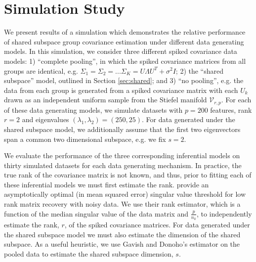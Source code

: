 \documentclass{article}
\begin{document}




\section{Simulation Study}

We present results of a simulation which demonstrates the
relative performance of shared subspace group covariance estimation
under different data generating models.  In this simulation, we consider three different
spiked covariance data models: 1) ``complete pooling'', in which the
spiked covariance matrices from all groups are identical, e.g.
$\Sigma_1 = \Sigma_2 = ... \Sigma_K = U\Lambda U^T + \sigma^2I$; 2)
the ``shared subspace'' model, outlined in Section \ref{sec:shared};
and 3) ``no pooling'', e.g. the data from each group is generated from
a spiked covariance matrix with each $U_k$ drawn as an independent
uniform sample from the Stiefel manifold $\mathcal{V}_{r, p}$.  For
each of these data generating models, we simulate datasets
with $p=200$ features, rank $r=2$ and eigenvalues
$(\lambda_1, \lambda_2) = (250, 25)$.  For data generated under the
shared subspace model, we additionally assume that the first two
eigenvectors span a common two dimensional subspace, e.g. we fix
$s=2$. 

We evaluate the performance of the three corresponding inferential
models on thirty simulated datasets for each data generating
mechanism.  In practice, the true rank of the covariance matrix is not
known, and thus, prior to fitting each of these inferential models we
must first estimate the rank.  \citet{Gavish2014} provide an
asymptotically optimal (in mean squared error) singular value
threshold for low rank matrix recovery with noisy data.  We use their
rank estimator, which is a function of the median singular value of
the data matrix and $\frac{p}{n_k}$, to independently estimate the
rank, $r$, of the spiked covariance matrices.  For data generated
under the shared subspace model we must also estimate the dimension of
the shared subspace.  As a useful heuristic, we use Gavish and
Donoho's estimator on the pooled data to estimate the shared subspace
dimension, $s$.
\end{document}
